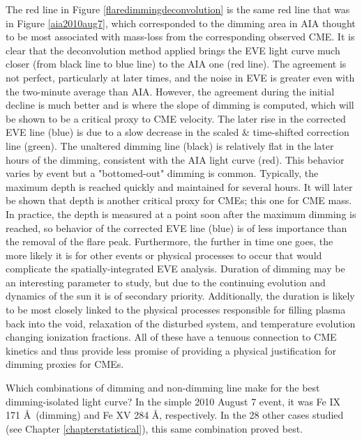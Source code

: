 The red line in Figure \ref{flaredimmingdeconvolution} is the same red line that was in Figure \ref{aia2010aug7}, which corresponded to the dimming area in AIA thought to be most associated with mass-loss from the corresponding observed CME. It is clear that the deconvolution method applied brings the EVE light curve much closer (from black line to blue line) to the AIA one (red line). The agreement is not perfect, particularly at later times, and the noise in EVE is greater even with the two-minute average than AIA. However, the agreement during the initial decline is much better and is where the slope of dimming is computed, which will be shown to be a critical proxy to CME velocity. The later rise in the corrected EVE line (blue) is due to a slow decrease in the scaled \& time-shifted correction line (green). The unaltered dimming line (black) is relatively flat in the later hours of the dimming, consistent with the AIA light curve (red). This behavior varies by event but a "bottomed-out" dimming is common. Typically, the maximum depth is reached quickly and maintained for several hours. It will later be shown that depth is another critical proxy for CMEs; this one for CME mass. In practice, the depth is measured at a point soon after the maximum dimming is reached, so behavior of the corrected EVE line (blue) is of less importance than the removal of the flare peak. Furthermore, the further in time one goes, the more likely it is for other events or physical processes to occur that would complicate the spatially-integrated EVE analysis. Duration of dimming may be an interesting parameter to study, but due to the continuing evolution and dynamics of the sun it is of secondary priority. Additionally, the duration is likely to be most closely linked to the physical processes responsible for filling plasma back into the void, relaxation of the disturbed system, and temperature evolution changing ionization fractions. All of these have a tenuous connection to CME kinetics and thus provide less promise of providing a physical justification for dimming proxies for CMEs. 

Which combinations of dimming and non-dimming line make for the best dimming-isolated light curve? In the simple 2010 August 7 event, it was Fe IX 171 \AA\ (dimming) and Fe XV 284 \AA, respectively. In the 28 other cases studied (see Chapter \ref{chapterstatistical}), this same combination proved best. 

